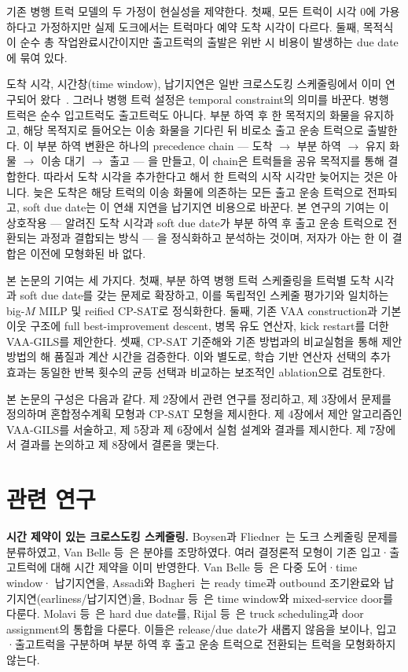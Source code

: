 \documentclass[10pt,a4paper]{article}
\begin{document}
기존 병행 트럭 모델의 두 가정이 현실성을 제약한다. 첫째, 모든 트럭이 시각
0에 가용하다고 가정하지만 실제 도크에서는 트럭마다 예약 도착 시각이 다르다. 둘째,
목적식이 순수 총 작업완료시간이지만 출고트럭의 출발은 위반 시 비용이 발생하는 due date에
묶여 있다.

도착 시각, 시간창(time window), 납기지연은 일반 크로스도킹 스케줄링에서 이미
연구되어 왔다~\cite{vanbelle2013,assadi2016,bodnar2017,molavi2018,rijal2019,li2026}.
그러나 병행 트럭 설정은 temporal constraint의 의미를 바꾼다. 병행 트럭은
순수 입고트럭도 출고트럭도 아니다. 부분 하역 후 한 목적지의 화물을 유지하고, 해당
목적지로 들어오는 이송 화물을 기다린 뒤 비로소 출고 운송 트럭으로 출발한다. 이 부분 하역
변환은 하나의 precedence chain --- 도착 $\to$
부분 하역 $\to$ 유지 화물 $\to$ 이송 대기 $\to$ 출고 ---
을 만들고, 이 chain은 트럭들을 공유 목적지를 통해 결합한다. 따라서 도착 시각을
추가한다고 해서 한 트럭의 시작 시각만 늦어지는 것은 아니다. 늦은 도착은 해당 트럭의
이송 화물에 의존하는 모든 출고 운송 트럭으로 전파되고, soft due date는 이 연쇄 지연을
납기지연 비용으로 바꾼다. 본 연구의 기여는 이 상호작용 --- 알려진 도착 시각과
soft due date가 부분 하역 후 출고 운송 트럭으로 전환되는 과정과 결합되는 방식 --- 을 정식화하고 분석하는
것이며, 저자가 아는 한 이 결합은 이전에 모형화된 바 없다.

본 논문의 기여는 세 가지다. 첫째, 부분 하역 병행 트럭 스케줄링을 트럭별
도착 시각과 soft due date를 갖는 문제로 확장하고, 이를 독립적인 스케줄 평가기와
일치하는 big-$M$ MILP 및 reified CP-SAT로 정식화한다. 둘째, 기존 VAA construction과
기본 이웃 구조에 full best-improvement descent, 병목 유도 연산자, kick
restart를 더한 VAA-GILS를 제안한다. 셋째, CP-SAT 기준해와 기존 방법과의 비교실험을
통해 제안 방법의 해 품질과 계산 시간을 검증한다. 이와 별도로, 학습 기반 연산자
선택의 추가 효과는 동일한 반복 횟수의 균등 선택과 비교하는 보조적인 ablation으로 검토한다.

본 논문의 구성은 다음과 같다. 제 2장에서 관련 연구를 정리하고, 제 3장에서 문제를
정의하며 혼합정수계획 모형과 CP-SAT 모형을 제시한다. 제 4장에서 제안 알고리즘인
VAA-GILS를 서술하고, 제 5장과 제 6장에서 실험 설계와 결과를 제시한다. 제 7장에서
결과를 논의하고 제 8장에서 결론을 맺는다.

\section{관련 연구}

\textbf{시간 제약이 있는 크로스도킹 스케줄링.} Boysen과 Fliedner~\cite{boysen2010}는
도크 스케줄링 문제를 분류하였고, Van Belle 등~\cite{vanbelle2012}은 분야를
조망하였다. 여러 결정론적 모형이 기존 입고·출고트럭에 대해 시간
제약을 이미 반영한다. Van Belle 등~\cite{vanbelle2013}은 다중 도어·time window·
납기지연을, Assadi와 Bagheri~\cite{assadi2016}는 ready time과 outbound
조기완료와 납기지연(earliness/납기지연)을, Bodnar 등~\cite{bodnar2017}은 time window와 mixed-service
door를 다룬다. Molavi 등~\cite{molavi2018}은 hard due date를, Rijal
등~\cite{rijal2019}은 truck scheduling과 door assignment의 통합을 다룬다. 이들은
release/due date가 새롭지 않음을 보이나, 입고·출고트럭을 구분하며 부분
하역 후 출고 운송 트럭으로 전환되는 트럭을 모형화하지 않는다.
\end{document}
